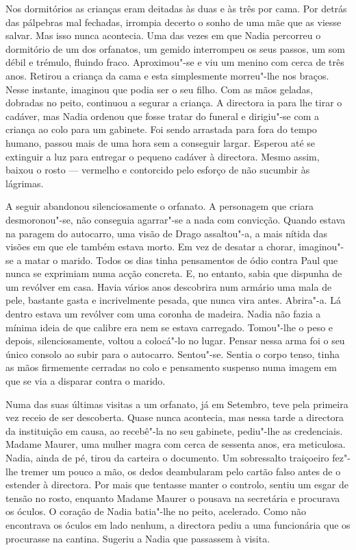 Nos dormitórios as crianças eram deitadas às duas e às três por cama.
Por detrás das pálpebras mal fechadas, irrompia decerto o sonho de uma
mãe que as viesse salvar. Mas isso nunca acontecia. Uma das vezes em que
Nadia percorreu o dormitório de um dos orfanatos, um gemido interrompeu
os seus passos, um som débil e trémulo, fluindo fraco. Aproximou"-se e
viu um menino com cerca de três anos. Retirou a criança da cama e esta
simplesmente morreu"-lhe nos braços. Nesse instante, imaginou que podia
ser o seu filho. Com as mãos geladas, dobradas no peito, continuou a
segurar a criança. A directora ia para lhe tirar o cadáver, mas Nadia
ordenou que fosse tratar do funeral e dirigiu"-se com a criança ao colo
para um gabinete. Foi sendo arrastada para fora do tempo humano,
passou mais de uma hora sem a conseguir largar. Esperou até se extinguir
a luz para entregar o pequeno cadáver à directora. Mesmo assim, baixou o
rosto --- vermelho e contorcido pelo esforço de não sucumbir às lágrimas.

A seguir abandonou silenciosamente o orfanato. A personagem que criara desmoronou"-se, não conseguia agarrar"-se a nada com
convicção. Quando estava na paragem do autocarro, uma visão de Drago
assaltou"-a, a mais
nítida das visões em que ele também estava morto. Em vez de desatar a
chorar, imaginou"-se a matar o marido. Todos os dias tinha pensamentos de
ódio contra Paul que nunca se exprimiam numa acção concreta. E, no
entanto, sabia que dispunha de um revólver em casa. Havia vários anos
descobrira num armário uma mala de pele, bastante gasta e incrivelmente
pesada, que nunca vira antes. Abrira"-a. Lá dentro estava um revólver com
uma coronha de madeira. Nadia não fazia a mínima ideia de que calibre
era nem se estava carregado. Tomou"-lhe o peso e depois, silenciosamente, voltou a colocá"-lo no lugar. Pensar nessa arma foi o seu único
consolo ao subir para o autocarro. Sentou"-se. Sentia o corpo tenso,
tinha as mãos firmemente cerradas no colo e pensamento suspenso numa
imagem em que se via a disparar contra o marido.

Numa das suas últimas visitas a um orfanato, já em
Setembro, teve pela primeira vez receio de ser descoberta. Quase nunca
acontecia, mas nessa tarde a directora da instituição em causa, ao
recebê"-la no seu gabinete, pediu"-lhe as credenciais. Madame Maurer, uma
mulher magra com cerca de sessenta anos, era meticulosa. Nadia, ainda de
pé, tirou da carteira o documento. Um sobressalto traiçoeiro fez"-lhe
tremer um pouco a mão, os dedos deambularam pelo cartão falso antes de o
estender à directora. Por mais que tentasse manter o controlo, sentiu um
esgar de tensão no rosto, enquanto Madame Maurer o pousava na secretária e procurava os óculos. O coração de Nadia batia"-lhe no peito,
acelerado. Como não encontrava os óculos em lado nenhum, a directora
pediu a uma funcionária que os procurasse na cantina. Sugeriu a Nadia
que passassem à visita.

